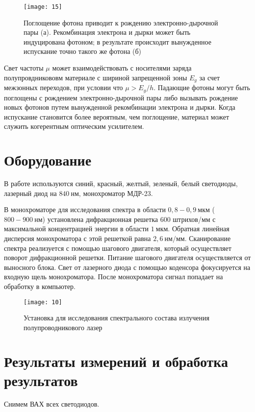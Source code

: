 \documentclass[a4paper, 12pt]{article}
\begin{document}
\begin{figure}[H]
    \texttt{[image: 15]} 
    \caption{Поглощение фотона приводит к рождению электронно-дырочной
    пары (а). Рекомбинация электрона и дырки может быть индуцирована
фотоном; в результате происходит вынужденное испускание точно такого
же фотона (б)}
\label{fig:15}
\end{figure}

Свет частоты $\mu$ может взаимодействовать с носителями заряда
полупровдникововм материале с шириной запрещенной зоны $E_{g}$ за счет
межзонных переходов, при условии что $\mu > E_{g}/h$. Падающие фотоны
могут быть поглощены с рождением электронно-дырочной пары либо
вызывать рождение новых фотонов путем вынужденной рекомбинации
электрона и дырки. Когда испускание становится более вероятным, чем
поглощение, материал может служить когерентным оптическим усилителем.




\section{Оборудование}
В работе используются синий, красный, желтый, зеленый, белый
светодиоды, лазерный диод на $840~нм$, монохроматор МДР-23.

В монохроматоре для исследования спектра в области $0,8-0,9\: мкм$
($800-900\: нм$) установлена дифракционная решетка $600$ штрихов/мм с
максимальной концентрацией энергии в области $1\: мкм$. Обратная
линейная дисперсия монохроматора с этой решеткой равна $2,6\: нм/мм$.
Сканирование спектра реализуется с помощью шагового двигателя, который
осуществляет поворот дифракционной решетки. Питание шагового двигателя
осуществляется от выносного блока. Свет от лазерного диода с помощью
коденсора фокусируется на входную щель монохроматора. После
монохроматора сигнал попадает на обработку в компьютер. 


\begin{figure}[H]
    \texttt{[image: 10]} 
    \caption{Установка для исследования спектрального состава
    излучения полупроводникового лазер}
    \label{fig:10}
\end{figure}





\section{Результаты измерений и обработка результатов}
Снимем ВАХ всех светодиодов. 
\end{document}
